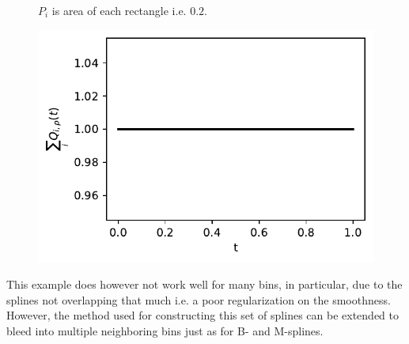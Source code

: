 \documentclass[../Thesis.tex]{subfiles}
\begin{document}
\begin{figure}[h]
\begin{subfigure}[t]{0.49\textwidth}
        \caption{}
    \end{subfigure}
    \caption{$P_i$ is area of each rectangle i.e. $0.2$.}
\end{figure}

\begin{figure}[h]
    \centering
    \includegraphics[width = .55\linewidth]{figures/MI estimation/Q-spline coefficient sum - degree 3.pdf}
    \caption{}
\end{figure}
This example does however not work well for many bins, in particular, due to the splines not overlapping that much i.e. a poor regularization on the smoothness. However, the method used for constructing this set of splines can be extended to bleed into multiple neighboring bins just as for B- and M-splines.

\newpage
\end{document}
